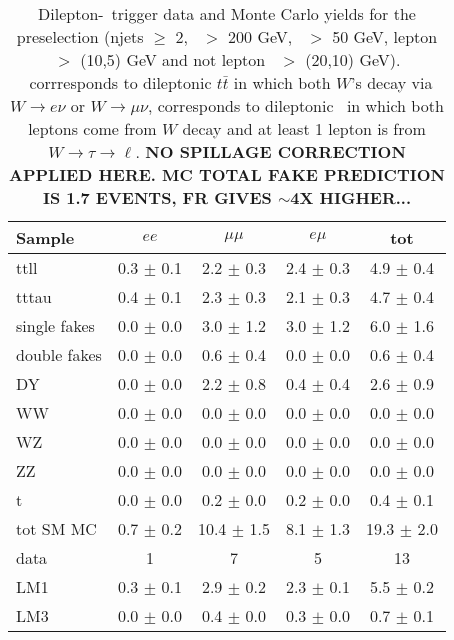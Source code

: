 \begin{table}[htb]
\begin{center}
\caption{\label{tab:yields3} 
Dilepton-\Ht\ trigger data and Monte Carlo yields for the preselection 
(njets $\geq$ 2, \Ht\ $>$ 200 GeV, \met\ $>$ 50 GeV, lepton \pt $>$ (10,5) GeV and not 
lepton \pt\ $>$ (20,10) GeV).
\ttll\ corrresponds  to dileptonic $t\bar{t}$ in which both $W$'s decay via $W\rightarrow e\nu$ or
$W\rightarrow \mu\nu$, \tttau corresponds to dileptonic \ttbar\ in which both leptons come from
$W$ decay and at least 1 lepton is from $W \to \tau \to \ell$. 
{\color{red} \bf NO SPILLAGE CORRECTION APPLIED HERE. MC TOTAL FAKE PREDICTION IS 1.7 EVENTS, FR GIVES $\sim$4X HIGHER... }
}
\begin{tabular}{l|cccc}

\hline
         Sample   &           $ee$   &       $\mu\mu$   &         $e\mu$   &            tot  \\
\hline
           ttll   &  0.3 $\pm$ 0.1   &  2.2 $\pm$ 0.3   &  2.4 $\pm$ 0.3   &  4.9 $\pm$ 0.4  \\
          tttau   &  0.4 $\pm$ 0.1   &  2.3 $\pm$ 0.3   &  2.1 $\pm$ 0.3   &  4.7 $\pm$ 0.4  \\
   single fakes   &  0.0 $\pm$ 0.0   &  3.0 $\pm$ 1.2   &  3.0 $\pm$ 1.2   &  6.0 $\pm$ 1.6  \\
   double fakes   &  0.0 $\pm$ 0.0   &  0.6 $\pm$ 0.4   &  0.0 $\pm$ 0.0   &  0.6 $\pm$ 0.4  \\
             DY   &  0.0 $\pm$ 0.0   &  2.2 $\pm$ 0.8   &  0.4 $\pm$ 0.4   &  2.6 $\pm$ 0.9  \\
             WW   &  0.0 $\pm$ 0.0   &  0.0 $\pm$ 0.0   &  0.0 $\pm$ 0.0   &  0.0 $\pm$ 0.0  \\
             WZ   &  0.0 $\pm$ 0.0   &  0.0 $\pm$ 0.0   &  0.0 $\pm$ 0.0   &  0.0 $\pm$ 0.0  \\
             ZZ   &  0.0 $\pm$ 0.0   &  0.0 $\pm$ 0.0   &  0.0 $\pm$ 0.0   &  0.0 $\pm$ 0.0  \\
              t   &  0.0 $\pm$ 0.0   &  0.2 $\pm$ 0.0   &  0.2 $\pm$ 0.0   &  0.4 $\pm$ 0.1  \\
\hline
      tot SM MC   &  0.7 $\pm$ 0.2   & 10.4 $\pm$ 1.5   &  8.1 $\pm$ 1.3   & 19.3 $\pm$ 2.0  \\
\hline
           data   &              1   &              7   &              5   &             13  \\
\hline
            LM1   &  0.3 $\pm$ 0.1   &  2.9 $\pm$ 0.2   &  2.3 $\pm$ 0.1   &  5.5 $\pm$ 0.2  \\
            LM3   &  0.0 $\pm$ 0.0   &  0.4 $\pm$ 0.0   &  0.3 $\pm$ 0.0   &  0.7 $\pm$ 0.1  \\
\hline
\end{tabular}
\end{center}
\end{table}

